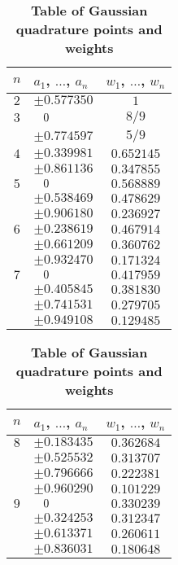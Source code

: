 \begin{center}\vspace{-7mm}
\begin{table}[ht]
\caption{\enskip \textbf{Table of Gaussian quadrature points and weights}}\vspace{3mm}
\small{\begin{center}\begin{tabular}{|c|l|c|}
\hline
\rowcolor{fillcolor}
$n$ & $a_1$, $\ldots$, $a_n$ & $w_1$, $\ldots$, $w_n$\\
\hline
$2$ & $\pm 0.577350$ & $1$\\
\hline
$3$ & $\hphantom{\pm} 0$ & $8/9$\\
{}  & $\pm 0.774597$ & $5/9$\\
\hline
$4$ & $\pm 0.339981$ & $0.652145$\\
{}  & $\pm 0.861136$ & $0.347855$\\
\hline
$5$ & $\hphantom{\pm} 0$ & $0.568889$\\
{}  & $\pm 0.538469$ & $0.478629$\\
{}  & $\pm 0.906180$ & $0.236927$\\
\hline
$6$ & $\pm 0.238619$ & $0.467914$\\
{}  & $\pm 0.661209$ & $0.360762$\\
{}  & $\pm 0.932470$ & $0.171324$\\
\hline
$7$ & $\hphantom{\pm} 0$ & $0.417959$\\
{}  & $\pm 0.405845$ & $0.381830$\\
{}  & $\pm 0.741531$ & $0.279705$\\
{}  & $\pm 0.949108$ & $0.129485$\\
\hline
\end{tabular}
\quad
\begin{tabular}{|c|l|c|}
\hline
\rowcolor{fillcolor}
$n$ & $a_1$, $\ldots$, $a_n$ & $w_1$, $\ldots$, $w_n$\\
\hline
$8$ & $\pm 0.183435$ & $0.362684$\\
{}  & $\pm 0.525532$ & $0.313707$\\
{}  & $\pm 0.796666$ & $0.222381$\\
{}  & $\pm 0.960290$ & $0.101229$\\
\hline
$9$ & $\hphantom{\pm} 0$ & $0.330239$\\
{}  & $\pm 0.324253$ & $0.312347$\\
{}  & $\pm 0.613371$ & $0.260611$\\
{}  & $\pm 0.836031$ & $0.180648$\\

\end{tabular}
\end{center}}
\end{table}
\end{center}

